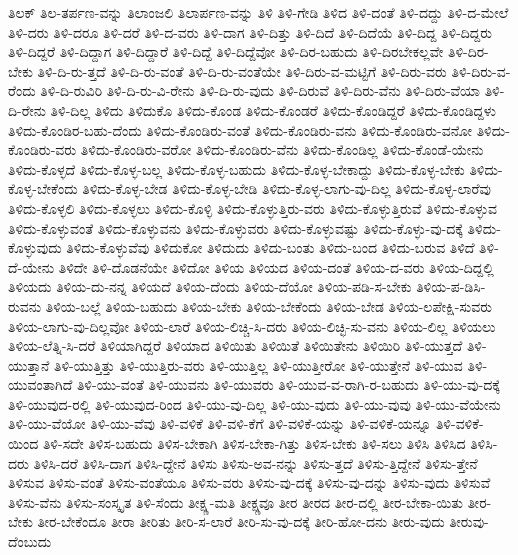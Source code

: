 {ತಿಲಕ್
ತಿಲ-ತರ್ಪಣ-ವನ್ನು
ತಿಲಾಂಜಲಿ
ತಿಲಾರ್ಪಣ-ವನ್ನು
ತಿಳಿ
ತಿಳಿ-ಗೇಡಿ
ತಿಳಿದ
ತಿಳಿ-ದಂತೆ
ತಿಳಿ-ದದ್ದು
ತಿಳಿ-ದ-ಮೇಲೆ
ತಿಳಿ-ದರು
ತಿಳಿ-ದರೂ
ತಿಳಿ-ದರೆ
ತಿಳಿ-ದ-ವರು
ತಿಳಿ-ದಾಗ
ತಿಳಿ-ದಿತ್ತು
ತಿಳಿ-ದಿದೆ
ತಿಳಿ-ದಿದೆಯೆ
ತಿಳಿ-ದಿದ್ದ
ತಿಳಿ-ದಿದ್ದರು
ತಿಳಿ-ದಿದ್ದರೆ
ತಿಳಿ-ದಿದ್ದಾಗ
ತಿಳಿ-ದಿದ್ದಾರೆ
ತಿಳಿ-ದಿದ್ದೆ
ತಿಳಿ-ದಿದ್ದೆವೋ
ತಿಳಿ-ದಿರ-ಬಹುದು
ತಿಳಿ-ದಿರಬೇಕಲ್ಲವೇ
ತಿಳಿ-ದಿರ-ಬೇಕು
ತಿಳಿ-ದಿ-ರು-ತ್ತದೆ
ತಿಳಿ-ದಿ-ರು-ವಂತೆ
ತಿಳಿ-ದಿ-ರು-ವಂತೆಯೇ
ತಿಳಿ-ದಿರು-ವ-ಮಟ್ಟಿಗೆ
ತಿಳಿ-ದಿರು-ವರು
ತಿಳಿ-ದಿರು-ವ-ರೆಂದು
ತಿಳಿ-ದಿ-ರುವಿರಿ
ತಿಳಿ-ದಿ-ರು-ವಿ-ರೇನು
ತಿಳಿ-ದಿ-ರು-ವುದು
ತಿಳಿ-ದಿರುವೆ
ತಿಳಿ-ದಿರು-ವೆನು
ತಿಳಿ-ದಿರು-ವೆಯಾ
ತಿಳಿ-ದಿ-ರೇನು
ತಿಳಿ-ದಿಲ್ಲ
ತಿಳಿದು
ತಿಳಿದುಕೊ
ತಿಳಿದು-ಕೊಂಡ
ತಿಳಿದು-ಕೊಂಡರೆ
ತಿಳಿದು-ಕೊಂಡಿದ್ದರೆ
ತಿಳಿದು-ಕೊಂಡಿದ್ದಳು
ತಿಳಿದು-ಕೊಂಡಿರ-ಬಹು-ದೆಂದು
ತಿಳಿದು-ಕೊಂಡಿರು-ವಂತೆ
ತಿಳಿದು-ಕೊಂಡಿರು-ವನು
ತಿಳಿದು-ಕೊಂಡಿರು-ವನೋ
ತಿಳಿದು-ಕೊಂಡಿರು-ವರು
ತಿಳಿದು-ಕೊಂಡಿರು-ವರೋ
ತಿಳಿದು-ಕೊಂಡಿರು-ವೆನು
ತಿಳಿದು-ಕೊಂಡಿಲ್ಲ
ತಿಳಿದು-ಕೊಂಡೆ-ಯೇನು
ತಿಳಿದು-ಕೊಳ್ಳದೆ
ತಿಳಿದು-ಕೊಳ್ಳ-ಬಲ್ಲ
ತಿಳಿದು-ಕೊಳ್ಳ-ಬಹುದು
ತಿಳಿದು-ಕೊಳ್ಳ-ಬೇಕಾದ್ದು
ತಿಳಿದು-ಕೊಳ್ಳ-ಬೇಕು
ತಿಳಿದು-ಕೊಳ್ಳ-ಬೇಕೆಂದು
ತಿಳಿದು-ಕೊಳ್ಳ-ಬೇಡ
ತಿಳಿದು-ಕೊಳ್ಳ-ಬೇಡಿ
ತಿಳಿದು-ಕೊಳ್ಳ-ಲಾಗು-ವು-ದಿಲ್ಲ
ತಿಳಿದು-ಕೊಳ್ಳ-ಲಾರೆವು
ತಿಳಿದು-ಕೊಳ್ಳಲಿ
ತಿಳಿದು-ಕೊಳ್ಳಲು
ತಿಳಿದು-ಕೊಳ್ಳಿ
ತಿಳಿದು-ಕೊಳ್ಳುತ್ತಿರು-ವರು
ತಿಳಿದು-ಕೊಳ್ಳುತ್ತಿರುವೆ
ತಿಳಿದು-ಕೊಳ್ಳುವ
ತಿಳಿದು-ಕೊಳ್ಳುವಂತೆ
ತಿಳಿದು-ಕೊಳ್ಳುವನು
ತಿಳಿದು-ಕೊಳ್ಳುವರು
ತಿಳಿದು-ಕೊಳ್ಳುವಷ್ಟು
ತಿಳಿದು-ಕೊಳ್ಳು-ವು-ದಕ್ಕೆ
ತಿಳಿದು-ಕೊಳ್ಳುವುದು
ತಿಳಿದು-ಕೊಳ್ಳುವೆವು
ತಿಳಿದುಕೋ
ತಿಳಿದುದು
ತಿಳಿದು-ಬಂತು
ತಿಳಿದು-ಬಂದ
ತಿಳಿದು-ಬರುವ
ತಿಳಿದೆ
ತಿಳಿ-ದೆ-ಯೇನು
ತಿಳಿದೇ
ತಿಳಿ-ದೊಡನೆಯೇ
ತಿಳಿದೋ
ತಿಳಿಯ
ತಿಳಿಯದ
ತಿಳಿಯ-ದಂತೆ
ತಿಳಿಯ-ದ-ವರು
ತಿಳಿಯ-ದಿದ್ದಲ್ಲಿ
ತಿಳಿಯದು
ತಿಳಿಯ-ದು-ನನ್ನ
ತಿಳಿಯದೆ
ತಿಳಿಯ-ದೆಂದು
ತಿಳಿಯ-ದೆಯೋ
ತಿಳಿಯ-ಪಡಿ-ಸ-ಬೇಕು
ತಿಳಿಯ-ಪ-ಡಿಸಿ-ರುವನು
ತಿಳಿಯ-ಬಲ್ಲೆ
ತಿಳಿಯ-ಬಹುದು
ತಿಳಿಯ-ಬೇಕು
ತಿಳಿಯ-ಬೇಕೆಂದು
ತಿಳಿಯ-ಬೇಡ
ತಿಳಿಯ-ಲಪೇಕ್ಷಿ-ಸುವರು
ತಿಳಿಯ-ಲಾಗು-ವು-ದಿಲ್ಲವೋ
ತಿಳಿಯ-ಲಾರೆ
ತಿಳಿಯ-ಲಿಚ್ಚಿ-ಸಿ-ದರು
ತಿಳಿಯ-ಲಿಚ್ಛಿ-ಸು-ವನು
ತಿಳಿಯ-ಲಿಲ್ಲ
ತಿಳಿಯಲು
ತಿಳಿಯ-ಲೆತ್ನಿ-ಸಿ-ದರೆ
ತಿಳಿಯಾಗಿದ್ದರೆ
ತಿಳಿಯಾದ
ತಿಳಿಯಿತು
ತಿಳಿಯಿತೆ
ತಿಳಿಯಿತೇನು
ತಿಳಿಯಿರಿ
ತಿಳಿ-ಯುತ್ತದೆ
ತಿಳಿ-ಯುತ್ತಾನೆ
ತಿಳಿ-ಯುತ್ತಿತ್ತು
ತಿಳಿ-ಯುತ್ತಿರು-ವರು
ತಿಳಿ-ಯುತ್ತಿಲ್ಲ
ತಿಳಿ-ಯುತ್ತೀರೋ
ತಿಳಿ-ಯುತ್ತೇನೆ
ತಿಳಿ-ಯುವ
ತಿಳಿ-ಯುವಂತಾಗಿದೆ
ತಿಳಿ-ಯು-ವಂತೆ
ತಿಳಿ-ಯುವನು
ತಿಳಿ-ಯುವರು
ತಿಳಿ-ಯುವ-ವ-ರಾಗಿ-ರ-ಬಹುದು
ತಿಳಿ-ಯು-ವು-ದಕ್ಕೆ
ತಿಳಿ-ಯುವುದ-ರಲ್ಲಿ
ತಿಳಿ-ಯುವುದ-ರಿಂದ
ತಿಳಿ-ಯು-ವು-ದಿಲ್ಲ
ತಿಳಿ-ಯು-ವುದು
ತಿಳಿ-ಯು-ವುವು
ತಿಳಿ-ಯು-ವೆಯೇನು
ತಿಳಿ-ಯು-ವೆಯೋ
ತಿಳಿ-ಯು-ವೆವು
ತಿಳಿ-ವಳಿಕೆ
ತಿಳಿ-ವಳಿ-ಕೆಗೆ
ತಿಳಿ-ವಳಿಕೆ-ಯನ್ನು
ತಿಳಿ-ವಳಿಕೆ-ಯನ್ನೂ
ತಿಳಿ-ವಳಿಕೆ-ಯಿಂದ
ತಿಳಿ-ಸದೇ
ತಿಳಿಸ-ಬಹುದು
ತಿಳಿಸ-ಬೇಕಾಗಿ
ತಿಳಿಸ-ಬೇಕಾ-ಗಿತ್ತು
ತಿಳಿಸ-ಬೇಕು
ತಿಳಿ-ಸಲು
ತಿಳಿಸಿ
ತಿಳಿಸಿದ
ತಿಳಿಸಿ-ದರು
ತಿಳಿಸಿ-ದರೆ
ತಿಳಿಸಿ-ದಾಗ
ತಿಳಿಸಿ-ದ್ದೇನೆ
ತಿಳಿಸು
ತಿಳಿಸು-ಅವ-ನನ್ನು
ತಿಳಿಸು-ತ್ತದೆ
ತಿಳಿಸು-ತ್ತಿದ್ದೇನೆ
ತಿಳಿಸು-ತ್ತೇನೆ
ತಿಳಿಸುವ
ತಿಳಿಸು-ವಂತೆ
ತಿಳಿಸು-ವಂತೆಯೂ
ತಿಳಿಸು-ವರು
ತಿಳಿಸು-ವು-ದಕ್ಕೆ
ತಿಳಿಸು-ವು-ದನ್ನು
ತಿಳಿಸು-ವುದು
ತಿಳಿಸುವೆ
ತಿಳಿಸು-ವೆನು
ತಿಳಿಸು-ಸಂಸ್ಕೃತ
ತಿಳಿ-ಸೆಂದು
ತೀಕ್ಷ್ಣ-ಮತಿ
ತೀಕ್ಷ್ಣವೂ
ತೀರ
ತೀರದ
ತೀರ-ದಲ್ಲಿ
ತೀರ-ಬೇಕಾ-ಯಿತು
ತೀರ-ಬೇಕು
ತೀರ-ಬೇಕೆಂದೂ
ತೀರಾ
ತೀರಿತು
ತೀರಿ-ಸ-ಲಾರೆ
ತೀರಿ-ಸು-ವು-ದಕ್ಕೆ
ತೀರಿ-ಹೋ-ದನು
ತೀರು-ವುದು
ತೀರುವು-ದೆಂಬುದು
}
